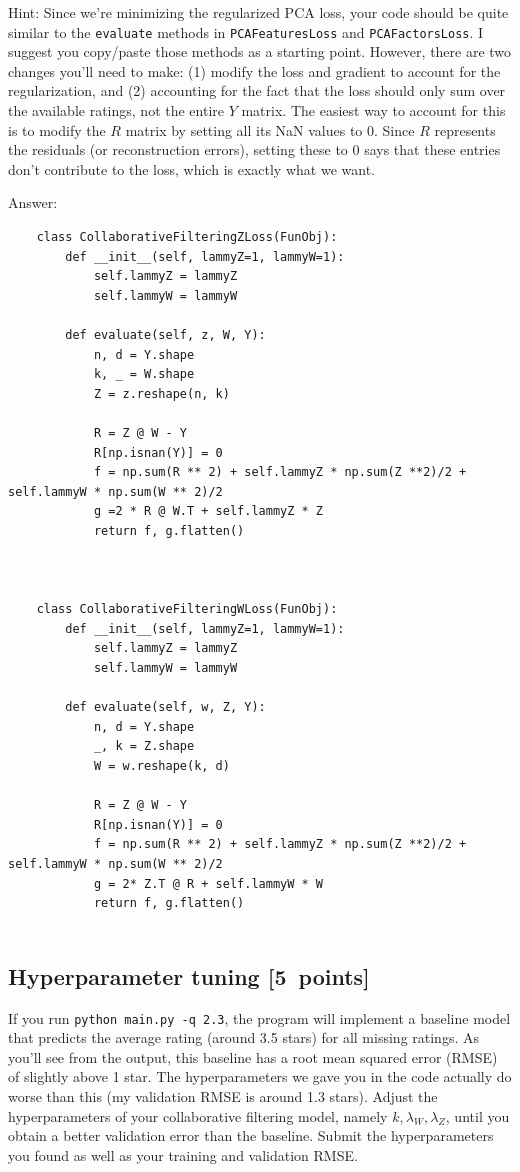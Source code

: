 \documentclass{article}
\newcommand{\blu}[1]{{\textcolor{blu}{#1}}}
\newenvironment{answer}{\par\begingroup\color{gre}Answer: }{\endgroup}
\let\ask\blu
\newcommand\pts[1]{\textcolor{pointscolour}{[#1~points]}}
\begin{document}
Hint: Since we're minimizing the regularized PCA loss, your code should be quite similar to the \texttt{evaluate} methods in \texttt{PCAFeaturesLoss} and \texttt{PCAFactorsLoss}. I suggest you copy/paste those methods as a starting point. However, there are two changes you'll need to make: (1) modify the loss and gradient to account for the regularization, and (2) accounting for the fact that the loss should only sum over the available ratings, not the entire $Y$ matrix. The easiest way to account for this is to modify the $R$ matrix by setting all its NaN values to 0. Since $R$ represents the residuals (or reconstruction errors), setting these to 0 says that these entries don't contribute to the loss, which is exactly what we want.
\begin{answer}
	\begin{verbatim}
	class CollaborativeFilteringZLoss(FunObj):
		def __init__(self, lammyZ=1, lammyW=1):
			self.lammyZ = lammyZ
			self.lammyW = lammyW

		def evaluate(self, z, W, Y):
			n, d = Y.shape
			k, _ = W.shape
			Z = z.reshape(n, k)

			R = Z @ W - Y
			R[np.isnan(Y)] = 0
			f = np.sum(R ** 2) + self.lammyZ * np.sum(Z **2)/2 + self.lammyW * np.sum(W ** 2)/2
			g =2 * R @ W.T + self.lammyZ * Z
			return f, g.flatten()



	class CollaborativeFilteringWLoss(FunObj):
		def __init__(self, lammyZ=1, lammyW=1):
			self.lammyZ = lammyZ
			self.lammyW = lammyW

		def evaluate(self, w, Z, Y):
			n, d = Y.shape
			_, k = Z.shape
			W = w.reshape(k, d)

			R = Z @ W - Y
			R[np.isnan(Y)] = 0
			f = np.sum(R ** 2) + self.lammyZ * np.sum(Z **2)/2 + self.lammyW * np.sum(W ** 2)/2
			g = 2* Z.T @ R + self.lammyW * W
			return f, g.flatten()
			
	\end{verbatim}
\end{answer}


\subsection{Hyperparameter tuning \pts{5}}
If you run \texttt{python main.py -q 2.3}, the program will implement a baseline model that predicts the average rating (around 3.5 stars) for all missing ratings.
As you'll see from the output, this baseline has a root mean squared error (RMSE) of slightly above 1 star. The hyperparameters we gave you in the code actually do worse than this (my validation RMSE is around 1.3 stars). \ask{Adjust the hyperparameters of your collaborative filtering model, namely $k,\lambda_W,\lambda_Z$, until you obtain a better validation error than the baseline. Submit the hyperparameters you found as well as your training and validation RMSE.}
\end{document}
